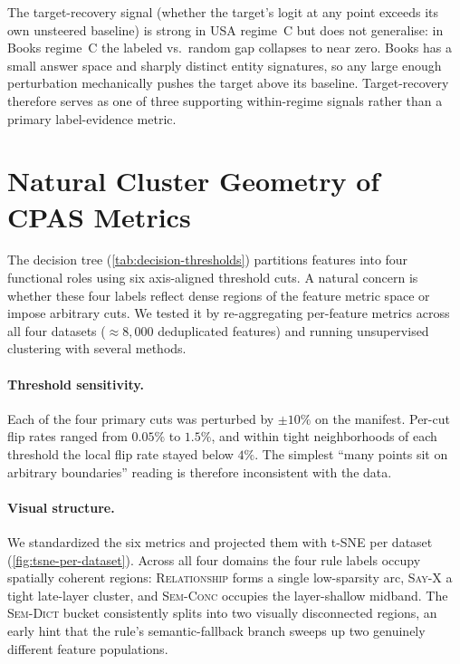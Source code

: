 The target-recovery signal (whether the target's logit at any point exceeds its own unsteered baseline) is strong in USA regime~C but does not generalise: in Books regime~C the labeled vs.\ random gap collapses to near zero. Books has a small answer space and sharply distinct entity signatures, so any large enough perturbation mechanically pushes the target above its baseline. Target-recovery therefore serves as one of three supporting within-regime signals rather than a primary label-evidence metric.


\section{Natural Cluster Geometry of CPAS Metrics}
\label{appx:clustering}

The decision tree (\cref{tab:decision-thresholds}) partitions features into four functional roles using six axis-aligned threshold cuts. A natural concern is whether these four labels reflect dense regions of the feature metric space or impose arbitrary cuts. We tested it by re-aggregating per-feature metrics across all four datasets ($\approx 8{,}000$ deduplicated features) and running unsupervised clustering with several methods.

\paragraph{Threshold sensitivity.}
Each of the four primary cuts was perturbed by $\pm 10\%$ on the manifest. Per-cut flip rates ranged from $0.05\%$ to $1.5\%$, and within tight neighborhoods of each threshold the local flip rate stayed below $4\%$. The simplest ``many points sit on arbitrary boundaries'' reading is therefore inconsistent with the data.

\paragraph{Visual structure.}
We standardized the six metrics and projected them with t-SNE per dataset (\cref{fig:tsne-per-dataset}). Across all four domains the four rule labels occupy spatially coherent regions: \textsc{Relationship} forms a single low-sparsity arc, \textsc{Say-X} a tight late-layer cluster, and \textsc{Sem-Conc} occupies the layer-shallow midband. The \textsc{Sem-Dict} bucket consistently splits into two visually disconnected regions, an early hint that the rule's semantic-fallback branch sweeps up two genuinely different feature populations.

